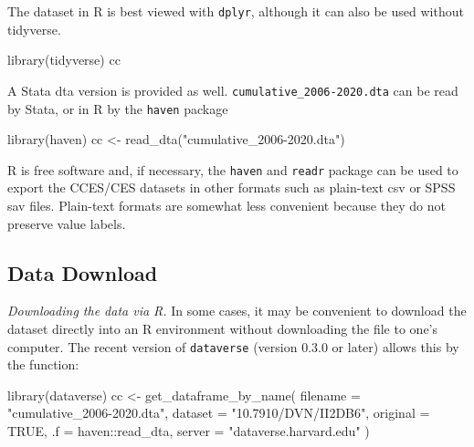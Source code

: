 \documentclass[10pt,article,oneside]{memoir}
\theoremstyle{definition}
\newenvironment{Shaded}{\begin{snugshade}}{\end{snugshade}}
\newcommand{\AttributeTok}[1]{\textcolor[rgb]{0.77,0.63,0.00}{#1}}
\newcommand{\ConstantTok}[1]{\textcolor[rgb]{0.00,0.00,0.00}{#1}}
\newcommand{\FunctionTok}[1]{\textcolor[rgb]{0.00,0.00,0.00}{#1}}
\newcommand{\NormalTok}[1]{#1}
\newcommand{\OtherTok}[1]{\textcolor[rgb]{0.56,0.35,0.01}{#1}}
\newcommand{\SpecialCharTok}[1]{\textcolor[rgb]{0.00,0.00,0.00}{#1}}
\newcommand{\StringTok}[1]{\textcolor[rgb]{0.31,0.60,0.02}{#1}}
\begin{document}
\noindent The dataset in R is best viewed with \texttt{dplyr}, although
it can also be used without tidyverse.

\begin{Shaded}
\begin{Highlighting}[]
\FunctionTok{library}\NormalTok{(tidyverse)}
\NormalTok{cc}
\end{Highlighting}
\end{Shaded}

\noindent  A Stata dta version is provided as well.
\texttt{cumulative\_2006-2020.dta} can be read by Stata, or in R by the
\texttt{haven} package

\begin{Shaded}
\begin{Highlighting}[]
\FunctionTok{library}\NormalTok{(haven)}
\NormalTok{cc }\OtherTok{\textless{}{-}} \FunctionTok{read\_dta}\NormalTok{(}\StringTok{"cumulative\_2006{-}2020.dta"}\NormalTok{)}
\end{Highlighting}
\end{Shaded}

R is free software and, if necessary, the \texttt{haven} and
\texttt{readr} package can be used to export the CCES/CES datasets in
other formats such as plain-text csv or SPSS sav files. Plain-text
formats are somewhat less convenient because they do not preserve value
labels.

\hypertarget{data-download}{%
\subsection{Data Download}\label{data-download}}

\noindent \emph{Downloading the data via R.} In some cases, it may be
convenient to download the dataset directly into an R environment
without downloading the file to one's computer. The recent version of
\texttt{dataverse} (version 0.3.0 or later) allows this by the function:

\begin{Shaded}
\begin{Highlighting}[]
\FunctionTok{library}\NormalTok{(dataverse)}
\NormalTok{cc }\OtherTok{\textless{}{-}} \FunctionTok{get\_dataframe\_by\_name}\NormalTok{(}
  \AttributeTok{filename =} \StringTok{"cumulative\_2006{-}2020.dta"}\NormalTok{,}
  \AttributeTok{dataset =} \StringTok{"10.7910/DVN/II2DB6"}\NormalTok{,}
  \AttributeTok{original =} \ConstantTok{TRUE}\NormalTok{,}
  \AttributeTok{.f =}\NormalTok{ haven}\SpecialCharTok{::}\NormalTok{read\_dta,}
  \AttributeTok{server =} \StringTok{"dataverse.harvard.edu"}
\NormalTok{)}
\end{Highlighting}
\end{Shaded}
\end{document}
